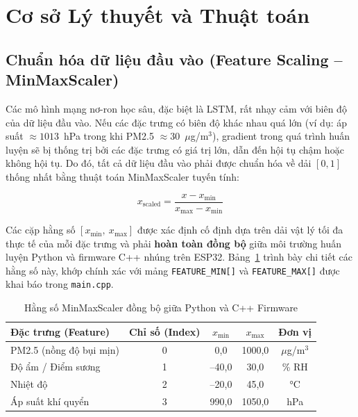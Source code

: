 \documentclass[12pt,a4paper]{article}
\begin{document}
\newpage

\section{Cơ sở Lý thuyết và Thuật toán}

\subsection{Chuẩn hóa dữ liệu đầu vào (Feature Scaling -- MinMaxScaler)}

Các mô hình mạng nơ-ron học sâu, đặc biệt là LSTM, rất nhạy cảm với biên độ của dữ liệu đầu vào. Nếu các đặc trưng có biên độ khác nhau quá lớn (ví dụ: áp suất $\approx 1013$~hPa trong khi PM2.5 $\approx 30$~$\mu$g/m$^3$), gradient trong quá trình huấn luyện sẽ bị thống trị bởi các đặc trưng có giá trị lớn, dẫn đến hội tụ chậm hoặc không hội tụ. Do đó, tất cả dữ liệu đầu vào phải được chuẩn hóa về dải $[0, 1]$ thống nhất bằng thuật toán MinMaxScaler tuyến tính:

\begin{equation}
    x_{\text{scaled}} = \frac{x - x_{\min}}{x_{\max} - x_{\min}}
    \label{eq:minmax_scale}
\end{equation}

Các cặp hằng số $[x_{\min},\ x_{\max}]$ được xác định cố định dựa trên dải vật lý tối đa thực tế của mỗi đặc trưng và phải \textbf{hoàn toàn đồng bộ} giữa môi trường huấn luyện Python và firmware C++ nhúng trên ESP32. Bảng~\ref{tab:feature_range} trình bày chi tiết các hằng số này, khớp chính xác với mảng \texttt{FEATURE\_MIN[]} và \texttt{FEATURE\_MAX[]} được khai báo trong \texttt{main.cpp}.

\begin{table}[H]
    \centering
    \caption{Hằng số MinMaxScaler đồng bộ giữa Python và C++ Firmware}
    \label{tab:feature_range}
    \begin{tabular}{lcccc}
        \toprule
        \textbf{Đặc trưng (Feature)} & \textbf{Chỉ số (Index)} & \boldmath$x_{\min}$ & \boldmath$x_{\max}$ & \textbf{Đơn vị} \\
        \midrule
        PM2.5 (nồng độ bụi mịn) & 0 & 0,0 & 1000,0 & $\mu$g/m$^3$ \\
        Độ ẩm / Điểm sương & 1 & --40,0 & 30,0 & \% RH \\
        Nhiệt độ & 2 & --20,0 & 45,0 & °C \\
        Áp suất khí quyển & 3 & 990,0 & 1050,0 & hPa \\
        \bottomrule
    \end{tabular}
\end{table}
\end{document}
